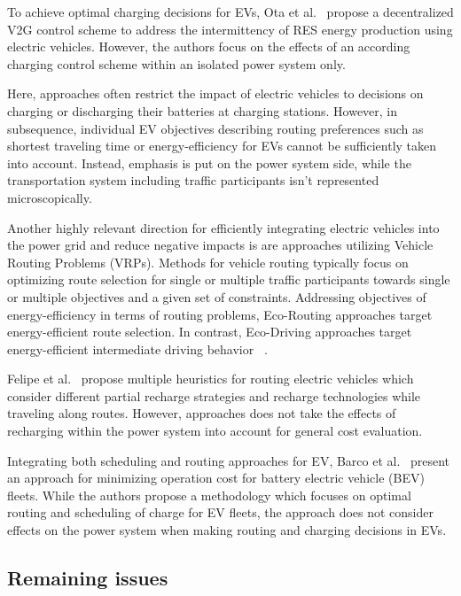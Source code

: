 To achieve optimal charging decisions for EVs, Ota et al.~\cite{ota2012autonomous} propose a decentralized V2G control scheme to address the intermittency of RES energy production using electric vehicles. However, the authors focus on the effects of an according charging control scheme within an isolated power system only.

Here, approaches often restrict the impact of electric vehicles to decisions on charging or discharging their batteries at charging stations. However, in subsequence, individual EV objectives describing routing preferences such as shortest traveling time or energy-efficiency for EVs cannot be sufficiently taken into account. Instead, emphasis is put on the power system side, while the transportation system including traffic participants isn't represented microscopically.

Another highly relevant direction for efficiently integrating electric vehicles into the power grid and reduce negative impacts is are approaches utilizing Vehicle Routing Problems (VRPs). Methods for vehicle routing typically focus on optimizing route selection for single or multiple traffic participants towards single or multiple objectives and a given set of constraints. Addressing objectives of energy-efficiency in terms of routing problems, Eco-Routing approaches target energy-efficient route selection. In contrast, Eco-Driving approaches target energy-efficient intermediate driving behavior ~\cite{ericsson2006optimizing}.

Felipe et al.~\cite{felipe2014heuristic} propose multiple heuristics for routing electric vehicles which consider different partial recharge strategies and recharge technologies while traveling along routes. However, approaches does not take the effects of recharging within the power system into account for general cost evaluation. 

Integrating both scheduling and routing approaches for EV, Barco et al.~\cite{barco2013optimal} present an approach for minimizing operation cost for battery electric vehicle (BEV) fleets. While the authors propose a methodology which focuses on optimal routing and scheduling of charge for EV fleets, the approach does not consider effects on the power system when making routing and charging decisions in EVs.

\subsection{Remaining issues}
\label{problems}

